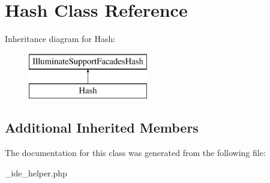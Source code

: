 \hypertarget{class_hash}{}\section{Hash Class Reference}
\label{class_hash}
Inheritance diagram for Hash\+:\begin{figure}[H]
\begin{center}
\leavevmode
\includegraphics[height=2.000000cm]{class_hash}
\end{center}
\end{figure}
\subsection*{Additional Inherited Members}


The documentation for this class was generated from the following file\+:\begin{DoxyCompactItemize}
\item 
\+\_\+ide\+\_\+helper.\+php\end{DoxyCompactItemize}

